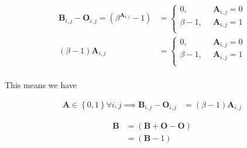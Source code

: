 \documentclass[11pt]{article}
\begin{document}
\begin{align*}
\mathbf{B}_{i,j}- \mathbf{O}_{i,j} = \left( \beta^{\mathbf{A}_{i,j}} -1 \right) &=
\begin{cases}
    0      , &\enspace \mathbf{A}_{i,j}=0  \\
    \beta-1, &\enspace \mathbf{A}_{i,j}=1  \\
\end{cases} \\
\left( \beta- 1 \right) \mathbf{A}_{i,j} &=
\begin{cases}
    0      , &\enspace \mathbf{A}_{i,j}=0  \\
    \beta-1, &\enspace \mathbf{A}_{i,j}=1  \\
\end{cases} \\
\end{align*}


This means we have


\begin{align*}
\mathbf{A} \in \left\{0, 1\right\} \forall i,j  \implies   \mathbf{B}_{i,j}- \mathbf{O}_{i,j} &= \left( \beta-1 \right) \mathbf{A}_{i,j}
\end{align*}



\begin{align*}
\mathbf{B}&= \left( \mathbf{B}+  \mathbf{O}- \mathbf{O} \right) \\
&= \left( \mathbf{B}- 1 \right)
\end{align*}
\end{document}
